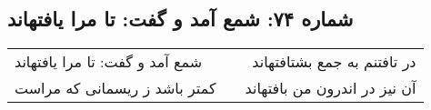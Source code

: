 \begin{center}
\section*{شماره ۷۴: شمع آمد و گفت: تا مرا یافتهاند}
\label{sec:074}
\begin{longtable}{l p{0.5cm} r}
شمع آمد و گفت: تا مرا یافتهاند
&&
در تافتنم به جمع بشتافتهاند
\\
کمتر باشد ز ریسمانی که مراست
&&
آن نیز در اندرون من بافتهاند
\\
\end{longtable}
\end{center}
